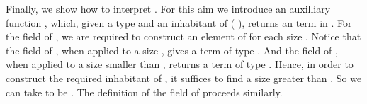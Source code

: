 
Finally, we show how to interpret . For this aim we
introduce an auxilliary function , which, given a type
 and an inhabitant  of ( ), returns an
term in  .  For the field  of 
 , we are required to construct an element of 
  for each size .
Notice that the field  of , when applied to a size
, gives a term  of type   . And the
field  of , when applied to a size  smaller
than , returns a term of type   .
Hence, in order to construct the required inhabitant of   , it suffices to find a size  greater than . So we can take  to be . The definition of the field  of  proceeds similarly.

